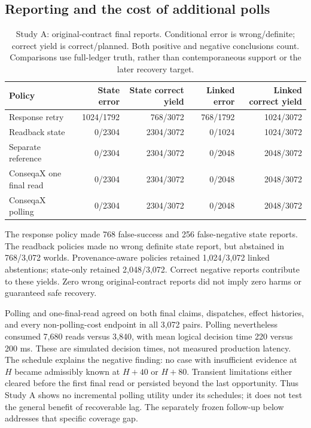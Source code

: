 \subsection{Reporting and the cost of additional polls}

\begin{table}[t]
\caption{Study A: original-contract final reports. Conditional error is wrong/definite; correct yield is correct/planned. Both positive and negative conclusions count. Comparisons use full-ledger truth, rather than contemporaneous support or the later recovery target.}
\label{tab:recovery-reports}
\centering\small
\setlength{\tabcolsep}{8pt}
\begin{tabular}{lrrrr}
\toprule
Policy & State error & State correct yield & Linked error & Linked correct yield \\
\midrule
Response retry & 1024/1792 & 768/3072 & 768/1792 & 1024/3072 \\
Readback state & 0/2304 & 2304/3072 & 0/1024 & 1024/3072 \\
Separate reference & 0/2304 & 2304/3072 & 0/2048 & 2048/3072 \\
ConseqaX one final read & 0/2304 & 2304/3072 & 0/2048 & 2048/3072 \\
ConseqaX polling & 0/2304 & 2304/3072 & 0/2048 & 2048/3072 \\
\bottomrule
\end{tabular}
\end{table}

The response policy made 768 false-success and 256 false-negative state reports. The readback policies made no wrong definite state report, but abstained in 768/3,072 worlds. Provenance-aware policies retained 1,024/3,072 linked abstentions; state-only retained 2,048/3,072. Correct negative reports contribute to these yields. Zero wrong original-contract reports did not imply zero harms or guaranteed safe recovery.

Polling and one-final-read agreed on both final claims, dispatches, effect histories, and every non-polling-cost endpoint in all 3,072 pairs. Polling nevertheless consumed 7,680 reads versus 3,840, with mean logical decision time 220 versus 200 ms. These are simulated decision times, not measured production latency. The schedule explains the negative finding: no case with insufficient evidence at $H$ became admissibly known at $H+40$ or $H+80$. Transient limitations either cleared before the first final read or persisted beyond the last opportunity. Thus Study A shows no incremental polling utility under its schedules; it does not test the general benefit of recoverable lag. The separately frozen follow-up below addresses that specific coverage gap.

